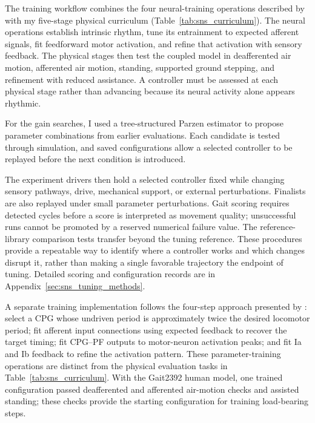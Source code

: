 The training workflow combines the four neural-training operations described by \citet{hunt_development_2017} with my five-stage physical curriculum (Table~\ref{tab:sns_curriculum}). The neural operations establish intrinsic rhythm, tune its entrainment to expected afferent signals, fit feedforward motor activation, and refine that activation with sensory feedback. The physical stages then test the coupled model in deafferented air motion, afferented air motion, standing, supported ground stepping, and refinement with reduced assistance. A controller must be assessed at each physical stage rather than advancing because its neural activity alone appears rhythmic.

For the gain searches, I used a tree-structured Parzen estimator to propose parameter combinations from earlier evaluations. Each candidate is tested through simulation, and saved configurations allow a selected controller to be replayed before the next condition is introduced.

The experiment drivers then hold a selected controller fixed while changing sensory pathways, drive, mechanical support, or external perturbations. Finalists are also replayed under small parameter perturbations. Gait scoring requires detected cycles before a score is interpreted as movement quality; unsuccessful runs cannot be promoted by a reserved numerical failure value. The reference-library comparison tests transfer beyond the tuning reference. These procedures provide a repeatable way to identify where a controller works and which changes disrupt it, rather than making a single favorable trajectory the endpoint of tuning. Detailed scoring and configuration records are in Appendix~\ref{sec:sns_tuning_methods}.

A separate training implementation follows the four-step approach presented by \citet{hunt_inrc_2019}: select a CPG whose undriven period is approximately twice the desired locomotor period; fit afferent input connections using expected feedback to recover the target timing; fit CPG--PF outputs to motor-neuron activation peaks; and fit Ia and Ib feedback to refine the activation pattern. These parameter-training operations are distinct from the physical evaluation tasks in Table~\ref{tab:sns_curriculum}. With the Gait2392 human model, one trained configuration passed deafferented and afferented air-motion checks and assisted standing; these checks provide the starting configuration for training load-bearing steps.

